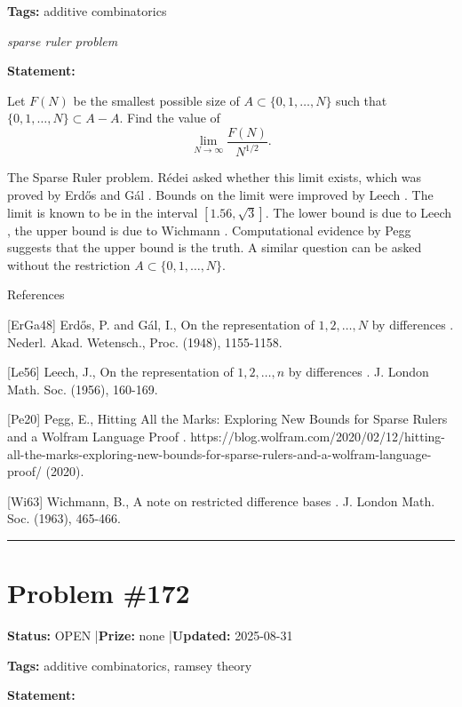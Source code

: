\documentclass{article}
\begin{document}
\noindent\textbf{Tags:} additive combinatorics

\medskip
\noindent\textit{sparse ruler problem}


\noindent\textbf{Statement:}

Let $F(N)$ be the smallest possible size of $A\subset \{0,1,\ldots,N\}$ such that $\{0,1,\ldots,N\}\subset A-A$. Find the value of\[\lim_{N\to \infty}\frac{F(N)}{N^{1/2}}.\]




The Sparse Ruler problem. R\'{e}dei asked whether this limit exists, which was proved by Erd\H{o}s and G\'{a}l \cite{ErGa48}. Bounds on the limit were improved by Leech \cite{Le56}. The limit is known to be in the interval $[1.56,\sqrt{3}]$. The lower bound is due to Leech \cite{Le56}, the upper bound is due to Wichmann \cite{Wi63}. Computational evidence by Pegg \cite{Pe20} suggests that the upper bound is the truth. A similar question can be asked without the restriction $A\subset \{0,1,\ldots,N\}$.




References

[ErGa48] Erd\H{o}s, P. and G\'{a}l, I., On the representation of $1,2,\ldots,N$ by differences . Nederl. Akad. Wetensch., Proc. (1948), 1155-1158.

[Le56] Leech, J., On the representation of $1,2,\ldots,n$ by differences . J. London Math. Soc. (1956), 160-169.

[Pe20] Pegg, E., Hitting All the Marks: Exploring New Bounds for Sparse Rulers and a Wolfram Language Proof . https://blog.wolfram.com/2020/02/12/hitting-all-the-marks-exploring-new-bounds-for-sparse-rulers-and-a-wolfram-language-proof/ (2020).

[Wi63] Wichmann, B., A note on restricted difference bases . J. London Math. Soc. (1963), 465-466.

\noindent\rule{\linewidth}{0.4pt}


\section{Problem \#172}
\label{prob:172}

\noindent\textbf{Status:} OPEN \quad|\quad \textbf{Prize:} none \quad|\quad \textbf{Updated:} 2025-08-31

\noindent\textbf{Tags:} additive combinatorics, ramsey theory

\medskip

\noindent\textbf{Statement:}
\end{document}
